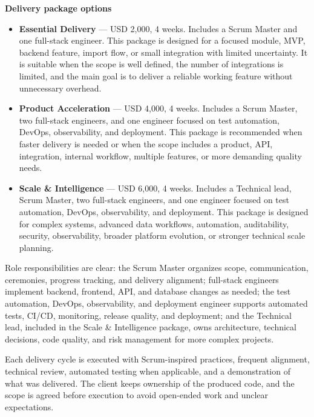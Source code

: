 \documentclass[11pt,a4paper]{article}
\begin{document}
\textbf{Delivery package options}\par

\begin{itemize}
\item \textbf{Essential Delivery} --- USD 2,000, 4 weeks. Includes a Scrum Master and one full-stack engineer. This package is designed for a focused module, MVP, backend feature, import flow, or small integration with limited uncertainty. It is suitable when the scope is well defined, the number of integrations is limited, and the main goal is to deliver a reliable working feature without unnecessary overhead.
\item \textbf{Product Acceleration} --- USD 4,000, 4 weeks. Includes a Scrum Master, two full-stack engineers, and one engineer focused on test automation, DevOps, observability, and deployment. This package is recommended when faster delivery is needed or when the scope includes a product, API, integration, internal workflow, multiple features, or more demanding quality needs.
\item \textbf{Scale \& Intelligence} --- USD 6,000, 4 weeks. Includes a Technical lead, Scrum Master, two full-stack engineers, and one engineer focused on test automation, DevOps, observability, and deployment. This package is designed for complex systems, advanced data workflows, automation, auditability, security, observability, broader platform evolution, or stronger technical scale planning.
\end{itemize}

Role responsibilities are clear: the Scrum Master organizes scope, communication, ceremonies, progress tracking, and delivery alignment; full-stack engineers implement backend, frontend, API, and database changes as needed; the test automation, DevOps, observability, and deployment engineer supports automated tests, CI/CD, monitoring, release quality, and deployment; and the Technical lead, included in the Scale \& Intelligence package, owns architecture, technical decisions, code quality, and risk management for more complex projects.\par

Each delivery cycle is executed with Scrum-inspired practices, frequent alignment, technical review, automated testing when applicable, and a demonstration of what was delivered. The client keeps ownership of the produced code, and the scope is agreed before execution to avoid open-ended work and unclear expectations.\par
\end{document}

